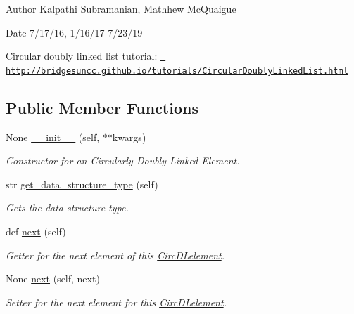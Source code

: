 \begin{DoxyAuthor}{Author}
Kalpathi Subramanian, Mathhew Mc\+Quaigue
\end{DoxyAuthor}
\begin{DoxyDate}{Date}
7/17/16, 1/16/17 7/23/19
\end{DoxyDate}
Circular doubly linked list tutorial\+: \href{http://bridgesuncc.github.io/tutorials/CircularDoublyLinkedList.html}{\texttt{ http\+://bridgesuncc.\+github.\+io/tutorials/\+Circular\+Doubly\+Linked\+List.\+html}} \subsection*{Public Member Functions}
\begin{DoxyCompactItemize}
\item 
None \mbox{\hyperlink{classbridges_1_1circ__dl__element_1_1_circ_d_lelement_a6db1440877da650713f41a3450377d49}{\+\_\+\+\_\+init\+\_\+\+\_\+}} (self, $\ast$$\ast$kwargs)
\begin{DoxyCompactList}\small\item\em Constructor for an Circularly Doubly Linked Element. \end{DoxyCompactList}\item 
str \mbox{\hyperlink{classbridges_1_1circ__dl__element_1_1_circ_d_lelement_a86837fc443104b20589874000821afbd}{get\+\_\+data\+\_\+structure\+\_\+type}} (self)
\begin{DoxyCompactList}\small\item\em Gets the data structure type. \end{DoxyCompactList}\item 
def \mbox{\hyperlink{classbridges_1_1circ__dl__element_1_1_circ_d_lelement_a09b8b12344743709cce1d5fd926b88e9}{next}} (self)
\begin{DoxyCompactList}\small\item\em Getter for the next element of this \mbox{\hyperlink{classbridges_1_1circ__dl__element_1_1_circ_d_lelement}{Circ\+D\+Lelement}}. \end{DoxyCompactList}\item 
None \mbox{\hyperlink{classbridges_1_1circ__dl__element_1_1_circ_d_lelement_adb12e76948e7515f1987fc3bdbe0e861}{next}} (self, next)
\begin{DoxyCompactList}\small\item\em Setter for the next element for this \mbox{\hyperlink{classbridges_1_1circ__dl__element_1_1_circ_d_lelement}{Circ\+D\+Lelement}}. \end{DoxyCompactList}\item 
$$
\end{DoxyCompactItemize}
